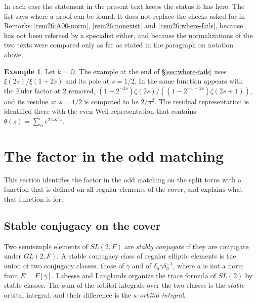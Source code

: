 \documentclass[12pt,letterpaper,openany]{book}
\theoremstyle{plain}
\theoremstyle{definition}
\newtheorem{example}[theorem]{Example}
\theoremstyle{remark}
\theoremstyle{remark}
\begin{document}
In each case the statement in the present text keeps the status it has
here. The list says where a proof can be found. It does not replace the
checks asked for in Remarks~\ref{rem26:A00-norm},
\ref{rem26:nonexist} and~\ref{rem26:where-fails}, because \cite{JC} has
not been refereed by a specialist either, and because the normalizations
of the two texts were compared only as far as stated in the paragraph on
notation above.

\begin{example}
Let $k={\mathbb Q}$. The example at the end of \S\ref{sec:where-fails}
uses $\xi(2s)/\xi(1+2s)$ and its pole at $s=1/2$. In \cite[Example~5.B]{JC}
the same function appears with the Euler factor at $2$ removed,
$(1-2^{-2s})\zeta(2s)/((1-2^{-1-2s})\zeta(2s+1))$, and its residue at
$s=1/2$ is computed to be $2/\pi^2$. The residual representation is
identified there with the even Weil representation that contains
$\theta(z)=\sum_ne^{2\pi in^2z}$.
\end{example}

\section{The factor in the odd matching}\label{sec:cover-factor}

This section identifies the factor in the odd matching on the split
torus with a function that is defined on all regular elements of the
cover, and explains what that function is for.

\subsection*{Stable conjugacy on the cover}

Two semisimple elements of $SL(2,F)$ are \emph{stably conjugate} if they
are conjugate under $GL(2,F)$. A stable conjugacy class of regular
elliptic elements is the union of two conjugacy classes, those of
$\gamma$ and of $\delta_a\gamma\delta_a^{-1}$, where $a$ is not a norm
from $E=F[\gamma]$. Labesse and Langlands \cite{LL} organize the trace
formula of $SL(2)$ by stable classes. The sum of the orbital integrals
over the two classes is the \emph{stable} orbital integral, and their
difference is the \emph{$\kappa$-orbital integral}.
\end{document}
